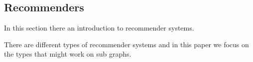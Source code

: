 \subsection{Recommenders}
In this section there an introduction to recommender systems.

There are different types of recommender systems and in this paper we focus on the types that might work on sub graphs.

\begin{definition} 
\end{definition}

\begin{definition} 
\end{definition}